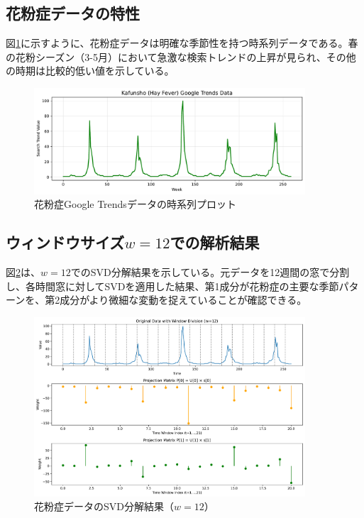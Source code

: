 \documentclass[a4paper,11pt]{jsarticle}
\begin{document}
\subsection{花粉症データの特性}

図\ref{fig:kafunsho-timeseries}に示すように、花粉症データは明確な季節性を持つ時系列データである。春の花粉シーズン（3-5月）において急激な検索トレンドの上昇が見られ、その他の時期は比較的低い値を示している。

\begin{figure}[H]
\centering
\includegraphics[width=0.9\textwidth]{figures/fig1_kafunsho_timeseries.pdf}
\caption{花粉症Google Trendsデータの時系列プロット}
\label{fig:kafunsho-timeseries}
\end{figure}

\subsection{ウィンドウサイズ$w=12$での解析結果}

図\ref{fig:kafunsho-svd-w12}は、$w=12$でのSVD分解結果を示している。元データを12週間の窓で分割し、各時間窓に対してSVDを適用した結果、第1成分が花粉症の主要な季節パターンを、第2成分がより微細な変動を捉えていることが確認できる。

\begin{figure}[H]
\centering
\includegraphics[width=0.9\textwidth]{figures/fig2_kafunsho_svd_w12.pdf}
\caption{花粉症データのSVD分解結果（$w=12$）}
\label{fig:kafunsho-svd-w12}
\end{figure}
\end{document}
